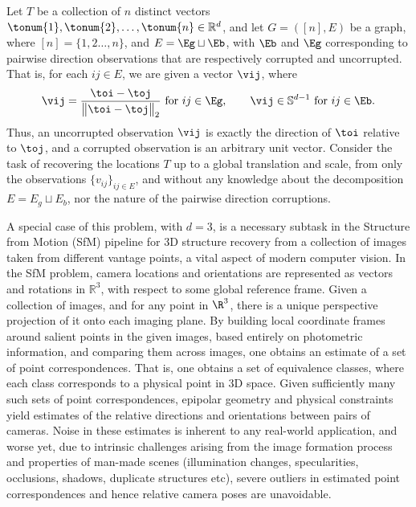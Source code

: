 Let $T$ be a collection of $n$ distinct vectors $\tonum{1},\tonum{2},\ldots,\tonum{n} \in \mathbb{R}^d$, and let $G = ([n],E)$ be a graph, where $[n] = \{1,2\ldots,n\}$, and $E = \Eg \sqcup \Eb$, with $\Eb$ and $\Eg$ corresponding to pairwise direction observations that are respectively corrupted and uncorrupted. That is, for each $ij \in E$, we are given a vector $\vij$, where
\begin{align}
\vij = \frac{\toi - \toj}{\bigl \|\toi - \toj \bigr\|_2} \text{ for } ij \in \Eg, \qquad \vij \in \mathbb{S}^{d-1}  \text{ for } ij \in \Eb. \label{measurements}
\end{align}
Thus, an uncorrupted observation $\vij$ is exactly the direction of $\toi$ relative to $\toj$, and a corrupted observation is an arbitrary unit vector. Consider the task of recovering the locations $T$ up to a global translation and scale, from only the observations $\{ v_{ij} \}_{ij \in E}$, and without any knowledge about the decomposition $E = E_g  \sqcup E_b $, nor the nature of the pairwise direction corruptions.

A special case of this problem, with $d=3$, is a necessary subtask in the Structure from Motion (SfM) pipeline for 3D structure recovery from a collection of images taken from different vantage points, a vital aspect of modern computer vision. In the SfM problem, camera locations and orientations are represented as vectors and rotations in $\mathbb{R}^3$, with respect to some global reference frame. Given a collection of images, and for any point in $\R^3$, there is a unique perspective projection of it onto each imaging plane. %
By building local coordinate frames around salient points in the given images, based entirely on photometric information, and comparing them across images, one obtains an estimate of a set of point correspondences. That is, one obtains a set of equivalence classes, where each class corresponds to a physical point in 3D space. Given sufficiently many such sets of point correspondences, epipolar geometry and physical constraints yield estimates of the relative directions and orientations between pairs of cameras. Noise in these estimates is inherent to any real-world application, and worse yet, due to intrinsic challenges arising from the image formation process and properties of man-made scenes (illumination changes, specularities, occlusions, shadows, duplicate structures etc), severe outliers in estimated point correspondences and hence relative camera poses are unavoidable. 

